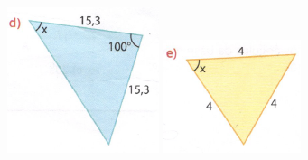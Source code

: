 \documentclass[a4paper,14pt]{article}
\begin{document}
\begin{multicols}{2}
\begin{enumerate}
			\includegraphics[width=1\linewidth]{6FMA124_imagens/imagem4}
			\includegraphics[width=1\linewidth]{6FMA124_imagens/imagem5}

\end{enumerate}
\end{multicols}
\end{document}
